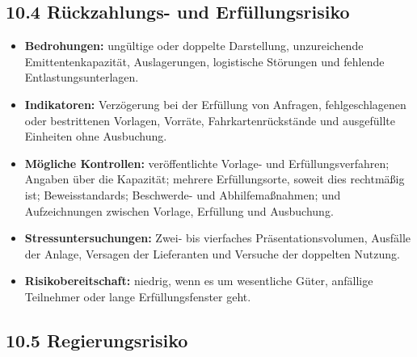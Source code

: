 \documentclass[11pt]{article}
\begin{document}
\subsection*{10.4 Rückzahlungs- und Erfüllungsrisiko}

\begin{itemize}[leftmargin=*]
\item \textbf{Bedrohungen:} ungültige oder doppelte Darstellung, unzureichende Emittentenkapazität, Auslagerungen, logistische Störungen und fehlende Entlastungsunterlagen.
\item \textbf{Indikatoren:} Verzögerung bei der Erfüllung von Anfragen, fehlgeschlagenen oder bestrittenen Vorlagen, Vorräte, Fahrkartenrückstände und ausgefüllte Einheiten ohne Ausbuchung.
\item \textbf{Mögliche Kontrollen:} veröffentlichte Vorlage- und Erfüllungsverfahren; Angaben über die Kapazität; mehrere Erfüllungsorte, soweit dies rechtmäßig ist; Beweisstandards; Beschwerde- und Abhilfemaßnahmen; und Aufzeichnungen zwischen Vorlage, Erfüllung und Ausbuchung.
\item \textbf{Stressuntersuchungen:} Zwei- bis vierfaches Präsentationsvolumen, Ausfälle der Anlage, Versagen der Lieferanten und Versuche der doppelten Nutzung.
\item \textbf{Risikobereitschaft:} niedrig, wenn es um wesentliche Güter, anfällige Teilnehmer oder lange Erfüllungsfenster geht.
\end{itemize}
\subsection*{10.5 Regierungsrisiko}
\end{document}

